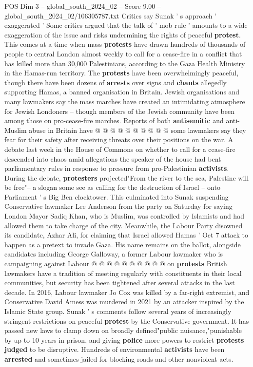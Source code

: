 \begin{textsample}{POS Dim 3 – global\_south\_2024\_02 – Score 9.00 – global\_south\_2024\_02/106305787.txt}
Critics say Sunak ' s approach ' exaggerated ' Some critics argued that the talk of ' mob rule ' amounts to a wide exaggeration of the issue and risks undermining the rights of peaceful \textbf{protest}.
This comes at a time when mass \textbf{protests} have drawn hundreds of thousands of people to central London almost weekly to call for a cease-fire in a conflict that has killed more than 30,000 Palestinians, according to the Gaza Health Ministry in the Hamas-run territory.
The \textbf{protests} have been overwhelmingly peaceful, though there have been dozens of \textbf{arrests} over signs and \textbf{chants} allegedly supporting Hamas, a banned organisation in Britain.
Jewish organisations and many lawmakers say the mass marches have created an intimidating atmosphere for Jewish Londoners -- though members of the Jewish community have been among those on pro-cease-fire marches.
Reports of both \textbf{antisemitic} and anti-Muslim abuse in Britain have @ @ @ @ @ @ @ @ @ @ some lawmakers say they fear for their safety after receiving threats over their positions on the war.
A debate last week in the House of Commons on whether to call for a cease-fire descended into chaos amid allegations the speaker of the house had bent parliamentary rules in response to pressure from pro-Palestinian \textbf{activists}.
During the debate, \textbf{protesters} projected"From the river to the sea, Palestine will be free"-- a slogan some see as calling for the destruction of Israel -- onto Parliament ' s Big Ben clocktower.
This culminated into Sunak suspending Conservative lawmaker Lee Anderson from the party on Saturday for saying London Mayor Sadiq Khan, who is Muslim, was controlled by Islamists and had allowed them to take charge of the city.
Meanwhile, the Labour Party disowned its candidate, Azhar Ali, for claiming that Israel allowed Hamas ' Oct 7 attack to happen as a pretext to invade Gaza.
His name remains on the ballot, alongside candidates including George Galloway, a former Labour lawmaker who is campaigning against Labour @ @ @ @ @ @ @ @ @ @ on \textbf{protests} British lawmakers have a tradition of meeting regularly with constituents in their local communities, but security has been tightened after several attacks in the last decade.
In 2016, Labour lawmaker Jo Cox was killed by a far-right extremist, and Conservative David Amess was murdered in 2021 by an attacker inspired by the Islamic State group.
Sunak ' s comments follow several years of increasingly stringent restrictions on peaceful \textbf{protest} by the Conservative government.
It has passed new laws to clamp down on broadly defined"public nuisance,"punishable by up to 10 years in prison, and giving \textbf{police} more powers to restrict \textbf{protests} \textbf{judged} to be disruptive.
Hundreds of environmental \textbf{activists} have been \textbf{arrested} and sometimes jailed for blocking roads and other nonviolent acts.

\end{textsample}
